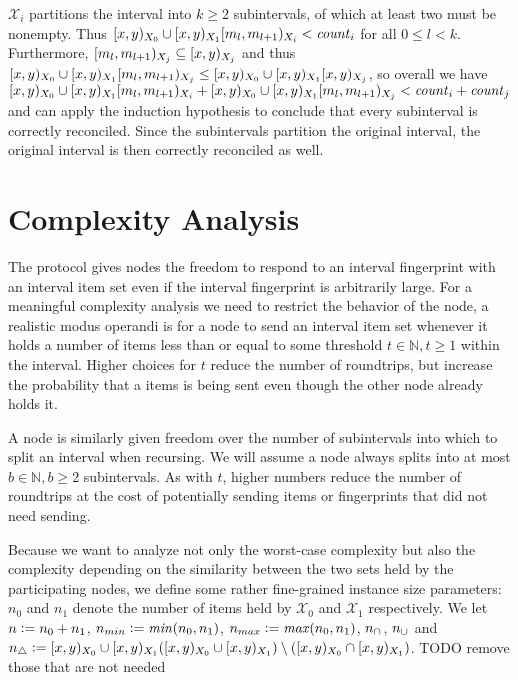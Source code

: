 \begin{caselist}
\begin{caselist}
$\mathcal{X}_i$ partitions the interval into $k \geq 2$ subintervals, of which at least two must be nonempty.
Thus $\abs{\interval{m_l}{m_{l + 1}}{X_i}} < \intcount{i}$ for all $0 \leq l < k$.
Furthermore, $[{m_l},{m_{l + 1}})_{X_j} \subseteq [{x},{y})_{X_j}$ and thus $\abs{\interval{m_l}{m_{l + 1}}{X_j}} \leq \abs{\interval{x}{y}{X_j}}$, so overall we have $\abs{\interval{m_l}{m_{l + 1}}{X_i}} + \abs{\interval{m_l}{m_{l + 1}}{X_j}} < \intcount{i} + \intcount{j}$ and can apply the induction hypothesis to conclude that every subinterval is correctly reconciled. Since the subintervals partition the original interval, the original interval is then correctly reconciled as well.
\end{caselist}
\end{caselist}

\section{Complexity Analysis}
\label{set-reconciliation-complexity}

The protocol gives nodes the freedom to respond to an interval fingerprint with an interval item set even if the interval fingerprint is arbitrarily large. For a meaningful complexity analysis we need to restrict the behavior of the node, a realistic modus operandi is for a node to send an interval item set whenever it holds a number of items less than or equal to some threshold $t \in \mathbb{N}, t \geq 1$ within the interval. Higher choices for $t$ reduce the number of roundtrips, but increase the probability that a items is being sent even though the other node already holds it.

A node is similarly given freedom over the number of subintervals into which to split an interval when recursing. We will assume a node always splits into at most $b \in \mathbb{N}, b \geq 2$ subintervals. As with $t$, higher numbers reduce the number of roundtrips at the cost of potentially sending items or fingerprints that did not need sending.

Because we want to analyze not only the worst-case complexity but also the complexity depending on the similarity between the two sets held by the participating nodes, we define some rather fine-grained instance size parameters: $n_0$ and $n_1$ denote the number of items held by $\mathcal{X}_0$ and $\mathcal{X}_1$ respectively. We let $n \vcentcolon= n_0 + n_1$, $n_{min} \vcentcolon= \mathit{min}(n_0, n_1)$, $n_{max} \vcentcolon= \mathit{max}(n_0, n_1)$, $n_{\cap} \def \abs{\interval{x}{y}{X_0} \cap \interval{x}{y}{X_1}}$, $n_{\cup} \def \abs{\interval{x}{y}{X_0} \cup \interval{x}{y}{X_1}}$ and $n_{\triangle} \defeq \abs{(\interval{x}{y}{X_0} \cup \interval{x}{y}{X_1}) \setminus (\interval{x}{y}{X_0} \cap \interval{x}{y}{X_1})}$. TODO remove those that are not needed

